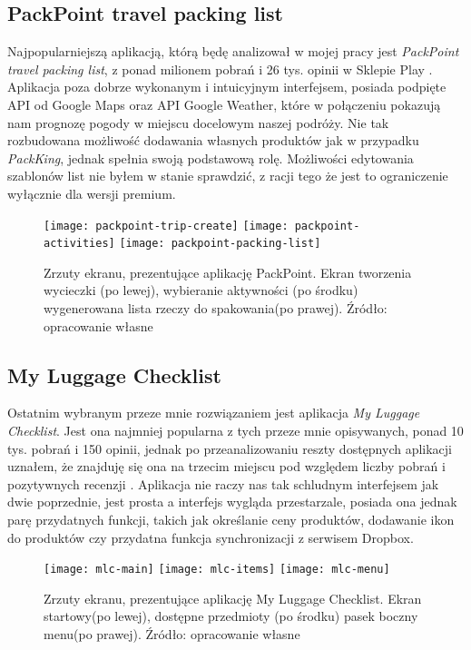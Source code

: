 \documentclass[a4paper,12pt]{article}
\begin{document}
\subsection{PackPoint travel packing list} \label{packpoint}

Najpopularniejszą aplikacją, którą będę analizował w mojej pracy jest \textit{PackPoint travel packing list}, z ponad milionem pobrań i 26 tys. opinii w Sklepie Play \cite{packpoint}. Aplikacja poza dobrze wykonanym i intuicyjnym interfejsem, posiada podpięte API od Google Maps oraz API Google Weather, które w połączeniu pokazują nam prognozę pogody w miejscu docelowym naszej podróży. Nie tak rozbudowana możliwość dodawania własnych produktów jak w przypadku \textit{PackKing}, jednak spełnia swoją podstawową rolę. Możliwości edytowania szablonów list nie byłem w stanie sprawdzić, z racji tego że jest to ograniczenie wyłącznie dla wersji premium.

\begin{figure}[H]
    \centering
		\texttt{[image: packpoint-trip-create]}
    \hfill
    \texttt{[image: packpoint-activities]}
    \hfill
    \texttt{[image: packpoint-packing-list]}
    \caption{Zrzuty ekranu, prezentujące aplikację PackPoint. Ekran tworzenia wycieczki (po lewej), wybieranie aktywności (po środku) wygenerowana lista rzeczy do spakowania(po prawej). Źródło: opracowanie własne}
    \label{fig:packpoint-screenshots}
\end{figure}

\subsection{My Luggage Checklist} \label{mlc}

Ostatnim wybranym przeze mnie rozwiązaniem jest aplikacja \textit{My Luggage Checklist}. Jest ona najmniej popularna z tych przeze mnie opisywanych, ponad 10 tys. pobrań i 150 opinii, jednak po przeanalizowaniu reszty dostępnych aplikacji uznałem, że znajduję się ona na trzecim miejscu pod względem liczby pobrań i pozytywnych recenzji \cite{mlc}. Aplikacja nie raczy nas tak schludnym interfejsem jak dwie poprzednie, jest prosta a interfejs wygląda przestarzale, posiada ona jednak parę przydatnych funkcji, takich jak określanie ceny produktów, dodawanie ikon do produktów czy przydatna funkcja synchronizacji z serwisem Dropbox.

\begin{figure}[H]
    \centering
    \texttt{[image: mlc-main]}
    \hfill
    \texttt{[image: mlc-items]}
    \hfill
    \texttt{[image: mlc-menu]}
    \caption{Zrzuty ekranu, prezentujące aplikację My Luggage Checklist. Ekran startowy(po lewej), dostępne przedmioty (po środku) pasek boczny menu(po prawej). Źródło: opracowanie własne}
    \label{fig:mlc-screenshots}
\end{figure}
\end{document}
